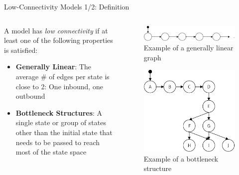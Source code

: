 \documentclass[aspectratio=169]{beamer}
\begin{document}
\begin{frame}{Low-Connectivity Models 1/2: Definition}
    \begin{columns}
        \begin{column}{.6\textwidth}
            A model has \emph{low connectivity} if at least one of the following properties is satisfied:
            \begin{itemize}
                \item \textbf{Generally Linear}: The average \# of edges per state is close to 2: One inbound, one outbound
                \item \textbf{Bottleneck Structures}: A single state or group of states other than the initial state that needs to be passed to reach most of the state space
            \end{itemize}
        \end{column}
        \begin{column}{.4\textwidth}
            \begin{figure}
                \includegraphics[width=.8\textwidth]{../figures/lc-ex-generally-linear}
                \caption{Example of a generally linear graph}
            \end{figure}
            \begin{figure}
                \includegraphics[width=.6\textwidth]{../figures/lc-ex-bottleneck}
                \caption{Example of a bottleneck structure}
            \end{figure}
        \end{column}
    \end{columns}
\end{frame}
\end{document}
